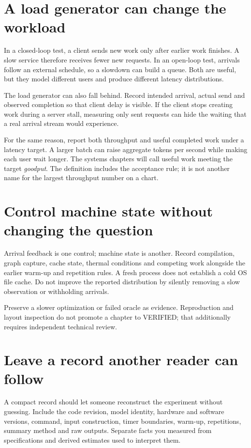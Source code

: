 \section{A load generator can change the workload}
In a closed-loop test, a client sends new work only after earlier work
finishes. A slow service therefore receives fewer new requests.
In an open-loop test, arrivals follow an external schedule, so a
slowdown can build a queue. Both are useful, but they model different
users and produce different latency distributions.

The load generator can also fall behind. Record intended arrival,
actual send and observed completion so that client delay is visible.
If the client stops creating work during a server stall, measuring
only sent requests can hide the waiting that a real arrival stream
would experience.

For the same reason, report both throughput and useful completed
work under a latency target. A larger batch can raise aggregate
tokens per second while making each user wait longer. The systems
chapters will call useful work meeting the target \emph{goodput}.
The definition includes the acceptance rule; it is not another name
for the largest throughput number on a chart.

\section{Control machine state without changing the question}
Arrival feedback is one control; machine state is another. Record
compilation, graph capture, cache state, thermal conditions and competing
work alongside the earlier warm-up and repetition rules. A fresh process
does not establish a cold OS file cache. Do not improve the reported
distribution by silently removing a slow observation or withholding arrivals.

Preserve a slower optimization or failed oracle as evidence. Reproduction
and layout inspection do not promote a chapter to VERIFIED; that additionally
requires independent technical review.

\section{Leave a record another reader can follow}
A compact record should let someone reconstruct the experiment
without guessing. Include the code revision, model identity,
hardware and software versions, command, input construction,
timer boundaries, warm-up, repetitions, summary method and raw
outputs. Separate facts you measured from specifications and
derived estimates used to interpret them.

